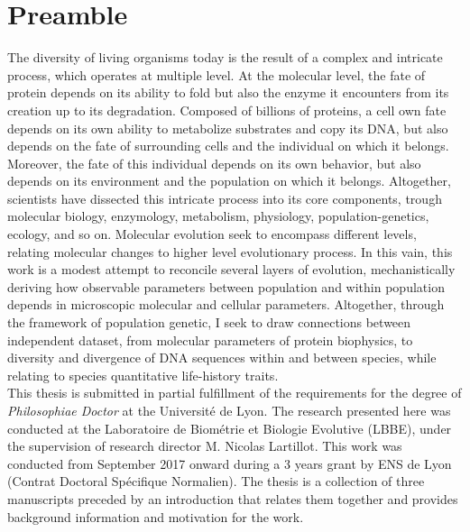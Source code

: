 \chapter*{Preamble}
The diversity of living organisms today is the result of a complex and intricate process, which operates at multiple level.
At the molecular level, the fate of protein depends on its ability to fold but also the enzyme it encounters from its creation up to its degradation. 
Composed of billions of proteins, a cell own fate depends on its own ability to metabolize substrates and copy its \acrshort{DNA}, but also depends on the fate of surrounding cells and the individual on which it belongs.
Moreover, the fate of this individual depends on its own behavior, but also depends on its environment and the population on which it belongs.
Altogether, scientists have dissected this intricate process into its core components, trough molecular biology, enzymology, metabolism, physiology, population-genetics, ecology, and so on. 
Molecular evolution seek to encompass different levels, relating molecular changes to higher level evolutionary process.
In this vain, this work is a modest attempt to reconcile several layers of evolution, mechanistically deriving how observable parameters between population and within population depends in microscopic molecular and cellular parameters.
Altogether, through the framework of population genetic, I seek to draw connections between independent dataset, from molecular parameters of protein biophysics, to diversity and divergence of \acrshort{DNA} sequences within and between species, while relating to species quantitative life-history traits.\\

This thesis is submitted in partial fulfillment of the requirements for the degree of \emph{Philosophiae Doctor} at the Université de Lyon.
The research presented here was conducted at the Laboratoire de Biométrie et Biologie Evolutive (LBBE), under the supervision of research director M. Nicolas Lartillot.
This work was conducted from September 2017 onward during a 3 years grant by ENS de Lyon (Contrat Doctoral Spécifique Normalien).
The thesis is a collection of three manuscripts preceded by an introduction that relates them together and provides background information and motivation for the work.